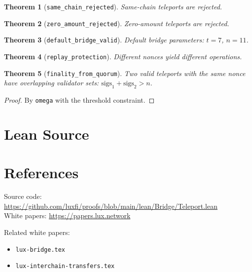 \documentclass[11pt]{article}
\newtheorem{theorem}{Theorem}
\begin{document}
\begin{theorem}[\texttt{same\_chain\_rejected}]
Same-chain teleports are rejected.
\end{theorem}

\begin{theorem}[\texttt{zero\_amount\_rejected}]
Zero-amount teleports are rejected.
\end{theorem}

\begin{theorem}[\texttt{default\_bridge\_valid}]
Default bridge parameters: $t=7$, $n=11$.
\end{theorem}

\begin{theorem}[\texttt{replay\_protection}]
Different nonces yield different operations.
\end{theorem}

\begin{theorem}[\texttt{finality\_from\_quorum}]
Two valid teleports with the same nonce have overlapping validator sets: $\text{sigs}_1 + \text{sigs}_2 > n$.
\end{theorem}
\begin{proof}
By \texttt{omega} with the threshold constraint.
\end{proof}


\section{Lean Source}


\section{References}
\noindent Source code: \url{https://github.com/luxfi/proofs/blob/main/lean/Bridge/Teleport.lean}\\
\noindent White papers: \url{https://papers.lux.network}

\noindent Related white papers:
\begin{itemize}
  \item \texttt{lux-bridge.tex}
  \item \texttt{lux-interchain-transfers.tex}
\end{itemize}
\end{document}
